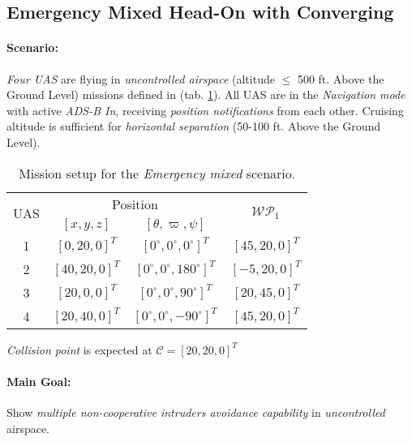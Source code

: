 \subsection{Emergency Mixed Head-On with Converging}\label{s:testEmergencyMixed}

    \noindent\paragraph{Scenario:} \emph{Four UAS} are flying in \emph{uncontrolled airspace} (altitude $\le$ 500 ft. Above the Ground Level) missions defined in (tab. \ref{tab:missionSetupEmergencyMixedScenario}). All UAS are in the \emph{Navigation mode} with active \emph{ADS-B In}, receiving \emph{position notifications} from each other. Cruising altitude is sufficient for \emph{horizontal separation} (50-100 ft. Above the Ground Level).
    
    
    \begin{table}[H]
        \centering
        \begin{tabular}{c||c|c||c}
            \multirow{2}{*}{UAS} &\multicolumn{2}{c||}{Position} & \multirow{2}{*}{$\mathscr{WP}_1$} \\\cline{2-3}
              & $[x,y,z]$           & $[\theta,\varpi,\psi]$           & \\\hline\hline
            1 & $[0,20,0]^T $       & $[0^\circ,0^\circ,0^\circ]^T$    & $[45,20,0]^T$\\\hline 
            2 & $[40,20,0]^T $       & $[0^\circ,0^\circ,180^\circ]^T$    & $[-5,20,0]^T$\\\hline 
            3 & $[20,0,0]^T $       & $[0^\circ,0^\circ,90^\circ]^T$    & $[20,45,0]^T$\\\hline 
            4 & $[20,40,0]^T $       & $[0^\circ,0^\circ,-90^\circ]^T$  & $[45,20,0]^T$\\ 
        \end{tabular}
        \caption{Mission setup for the \emph{Emergency mixed} scenario.}
        \label{tab:missionSetupEmergencyMixedScenario}
    \end{table}
    
    \begin{note}
        \emph{Collision point} is expected at $\mathscr{C}=[20,20,0]^T$
    \end{note}
    
    \noindent \paragraph{Main Goal:} Show \emph{multiple non-cooperative intruders avoidance capability} in \emph{uncontrolled} airspace.
    
